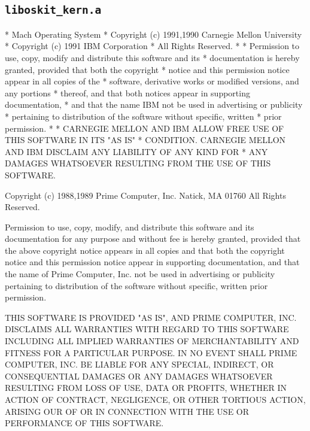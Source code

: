 \subsection{\texttt{liboskit_kern.a}}
\begin{copyrightEnv}
 * Mach Operating System
 * Copyright (c) 1991,1990 Carnegie Mellon University
 * Copyright (c) 1991 IBM Corporation
 * All Rights Reserved.
 *
 * Permission to use, copy, modify and distribute this software and its
 * documentation is hereby granted, provided that both the copyright
 * notice and this permission notice appear in all copies of the
 * software, derivative works or modified versions, and any portions
 * thereof, and that both notices appear in supporting documentation,
 * and that the name IBM not be used in advertising or publicity
 * pertaining to distribution of the software without specific, written
 * prior permission.
 *
 * CARNEGIE MELLON AND IBM ALLOW FREE USE OF THIS SOFTWARE IN ITS "AS IS"
 * CONDITION.  CARNEGIE MELLON AND IBM DISCLAIM ANY LIABILITY OF ANY KIND FOR
 * ANY DAMAGES WHATSOEVER RESULTING FROM THE USE OF THIS SOFTWARE.
\end{copyrightEnv}

\begin{copyrightEnv}
Copyright (c) 1988,1989 Prime Computer, Inc.  Natick, MA 01760
All Rights Reserved.

Permission to use, copy, modify, and distribute this software and its
documentation for any purpose and without fee is hereby granted,
provided that the above copyright notice appears in all copies and
that both the copyright notice and this permission notice appear in
supporting documentation, and that the name of Prime Computer,
Inc. not be used in advertising or publicity pertaining to
distribution of the software without specific, written prior
permission.

THIS SOFTWARE IS PROVIDED "AS IS", AND PRIME COMPUTER, INC. DISCLAIMS
ALL WARRANTIES WITH REGARD TO THIS SOFTWARE INCLUDING ALL IMPLIED
WARRANTIES OF MERCHANTABILITY AND FITNESS FOR A PARTICULAR PURPOSE.
IN NO EVENT SHALL PRIME COMPUTER, INC.  BE LIABLE FOR ANY SPECIAL,
INDIRECT, OR CONSEQUENTIAL DAMAGES OR ANY DAMAGES WHATSOEVER RESULTING
FROM LOSS OF USE, DATA OR PROFITS, WHETHER IN ACTION OF CONTRACT,
NEGLIGENCE, OR OTHER TORTIOUS ACTION, ARISING OUR OF OR IN CONNECTION
WITH THE USE OR PERFORMANCE OF THIS SOFTWARE.
\end{copyrightEnv}


